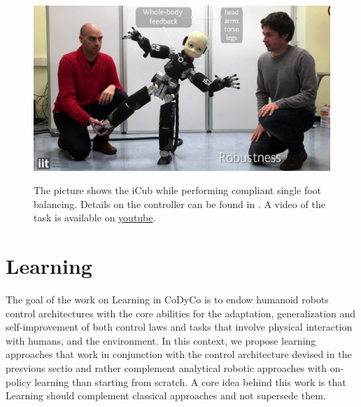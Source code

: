 \documentclass[final,5p,twocolumn]{elsarticle}
\begin{document}
\begin{figure}[h!]
\centering
{\includegraphics[width=\linewidth]{images/single_foot_balancing.jpg}}
\caption{The picture shows the iCub while performing compliant single foot balancing. Details on the controller can be found in \cite{Nori2015a}. A video of the task is available on \href{https://www.youtube.com/watch?v=SYVCbzGsBF4}{youtube}.}%
\label{fig:footBalancing}
\end{figure}


\section{Learning}

The goal of the work on Learning in CoDyCo is to endow humanoid robots control architectures with the core abilities for the adaptation, generalization and self-improvement of both control laws and tasks that involve physical interaction with humans, and the environment. In this context, we propose learning approaches that work in conjunction with the control architecture devised in the presvious sectio  and rather complement analytical robotic approaches with on-policy learning than starting from scratch. A core idea behind this work is that Learning should complement classical approaches and not supersede them.

\end{document}
